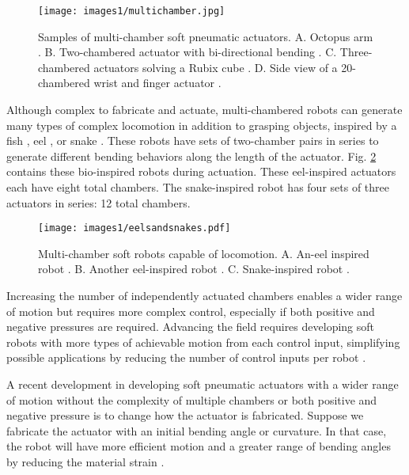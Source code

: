 \begin{figure}[!ht]
    \centering
    \texttt{[image: images1/multichamber.jpg]}
    \caption{Samples of multi-chamber soft pneumatic actuators. A. Octopus arm \cite{xie_octopus_2020}. B. Two-chambered actuator with bi-directional bending \cite{bilodeau_design_2018}. C. Three-chambered actuators solving a Rubix cube \cite{pagoli_soft_2021}. D. Side view of a 20-chambered wrist and finger actuator \cite{fei_novel_2019}.}
    \label{fig:multichamber}
\end{figure}

Although complex to fabricate and actuate, multi-chambered robots can generate many types of complex locomotion in addition to grasping objects, inspired by a fish \cite{zhou_modeling_2020}, eel \cite{feng_body_2020,nguyen_anguilliform_2022}, or snake \cite{arachchige_wheelless_2023}. These robots have sets of two-chamber pairs in series to generate different bending behaviors along the length of the actuator. Fig. \ref{fig:eelsandsnakes} contains these bio-inspired robots during actuation. These eel-inspired actuators each have eight total chambers. The snake-inspired robot has four sets of three actuators in series: 12 total chambers. \\

\begin{figure}[!ht]
    \centering
    \texttt{[image: images1/eelsandsnakes.pdf]}
    \caption{Multi-chamber soft robots capable of locomotion. A. An-eel inspired robot \cite{feng_body_2020}. B. Another eel-inspired robot \cite{nguyen_anguilliform_2022}. C. Snake-inspired robot \cite{arachchige_wheelless_2023}.}
    \label{fig:eelsandsnakes}
\end{figure}

Increasing the number of independently actuated chambers enables a wider range of motion but requires more complex control, especially if both positive and negative pressures are required. Advancing the field requires developing soft robots with more types of achievable motion from each control input, simplifying possible applications by reducing the number of control inputs per robot \cite{gorissen_elastic_2017}. 

A recent development in developing soft pneumatic actuators with a wider range of motion without the complexity of multiple chambers or both positive and negative pressure is to change how the actuator is fabricated. Suppose we fabricate the actuator with an initial bending angle or curvature. In that case, the robot will have more efficient motion and a greater range of bending angles by reducing the material strain \cite{perez-guagnelli_deflected_2022}. 

